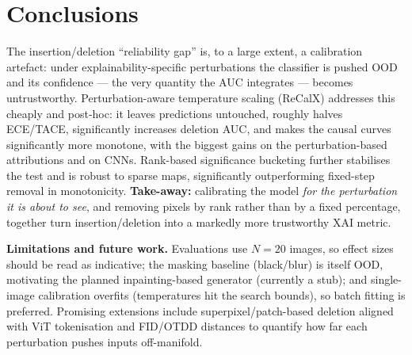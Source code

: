 \documentclass[11pt]{article}
\begin{document}

\section{Conclusions}
The insertion/deletion ``reliability gap'' is, to a large extent, a calibration
artefact: under explainability-specific perturbations the classifier is pushed
OOD and its confidence --- the very quantity the AUC integrates --- becomes
untrustworthy. Perturbation-aware temperature scaling (ReCalX) addresses this
cheaply and post-hoc: it leaves predictions untouched, roughly halves ECE/TACE,
significantly increases deletion AUC, and makes the causal curves significantly
more monotone, with the biggest gains on the perturbation-based attributions and
on CNNs. Rank-based significance bucketing further stabilises the test and is
robust to sparse maps, significantly outperforming fixed-step removal in
monotonicity. \textbf{Take-away:} calibrating the model \emph{for the
perturbation it is about to see}, and removing pixels by rank rather than by a
fixed percentage, together turn insertion/deletion into a markedly more
trustworthy XAI metric.

\textbf{Limitations and future work.} Evaluations use $N{=}20$ images, so effect
sizes should be read as indicative; the masking baseline (black/blur) is itself
OOD, motivating the planned inpainting-based generator (currently a stub); and
single-image calibration overfits (temperatures hit the search bounds), so
batch fitting is preferred. Promising extensions include superpixel/patch-based
deletion aligned with ViT tokenisation and FID/OTDD distances to quantify how
far each perturbation pushes inputs off-manifold.
\end{document}
